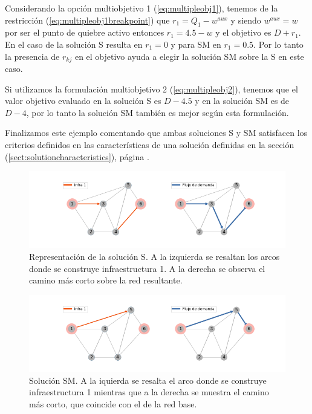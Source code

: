 \documentclass{article}
\begin{document}
  Considerando la opción multiobjetivo 1 (\ref{eq:multipleobj1}), tenemos de la restricción (\ref{eq:multipleobj1breakpoint}) que $r_1 = Q_1 - w^{aux}$ y siendo $w^{aux} = w$ por ser el punto de quiebre activo entonces $r_1 = 4.5 - w$ y el objetivo es $D + r_1$. En el caso de la solución S resulta en $r_1 = 0$ y para SM en $r_1 = 0.5$. Por lo tanto la presencia de $r_{kj}$ en el objetivo ayuda a elegir la solución SM sobre la S en este caso.

  Si utilizamos la formulación multiobjetivo 2 (\ref{eq:multipleobj2}), tenemos que el valor objetivo evaluado en la solución S es $D - 4.5$ y en la solución SM es de $D - 4$, por lo tanto la solución SM también es mejor según esta formulación.

  Finalizamos este ejemplo comentando que ambas soluciones S y SM satisfacen los criterios definidos en las características de una solución definidas en la sección (\ref{sect:solutioncharacteristics}), página \pageref{sect:solutioncharacteristics}.

  \begin{figure}[h!]
    \centering
    \includegraphics[width=12cm]{../resources/example_2_sol_v2.png}
      \caption{Representación de la solución S. A la izquierda se resaltan los arcos donde se construye infraestructura 1. A la derecha se observa el camino más corto sobre la red resultante.}
    \label{fig:example2solv2}
  \end{figure}

  \begin{figure}[h!]
    \centering
    \includegraphics[width=12cm]{../resources/example_2_sol_v1.png}
      \caption{Solución SM. A la iquierda se resalta el arco donde se construye infraestructura 1 mientras que a la derecha se muestra el camino más corto, que coincide con el de la red base.}
    \label{fig:example2solv1}
  \end{figure}
\end{document}
